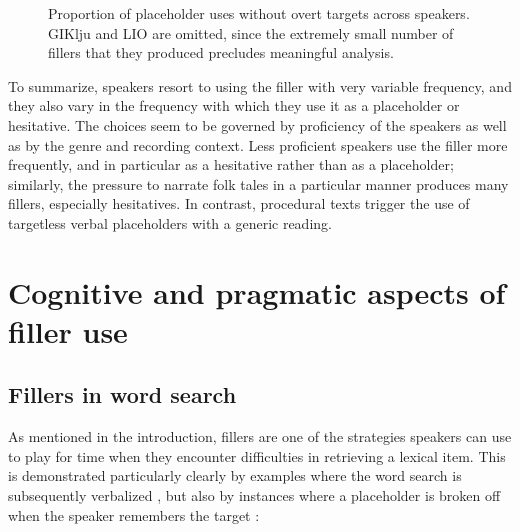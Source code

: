 \documentclass[output=paper]{langscibook}
\begin{document}
\begin{figure}
 \caption{\label{fig:pakendorf:20} Proportion of placeholder uses without overt targets across speakers. GIKlju and LIO are omitted, since the extremely small number of fillers that they produced precludes meaningful analysis.}
\end{figure}

To summarize, speakers resort to using the filler with very variable frequency, and they also vary in the frequency with which they use it as a placeholder or hesitative. The choices seem to be governed by proficiency of the speakers as well as by the genre and recording context. Less proficient speakers use the filler more frequently, and in particular as a hesitative rather than as a placeholder; similarly, the pressure to narrate folk tales in a particular manner produces many fillers, especially hesitatives. In contrast, procedural texts trigger the use of targetless verbal placeholders with a generic reading.

\section{Cognitive and pragmatic aspects of filler use}
\label{sec:pakendorf:5}
\subsection{Fillers in word search}
\label{sec:pakendorf:5.1}
As mentioned in the introduction, fillers are one of the strategies speakers can use to play for time when they encounter difficulties in retrieving a lexical item. This is demonstrated particularly clearly by examples where the word search is subsequently verbalized , but also by instances where a placeholder is broken off when the speaker remembers the target : 
\end{document}
